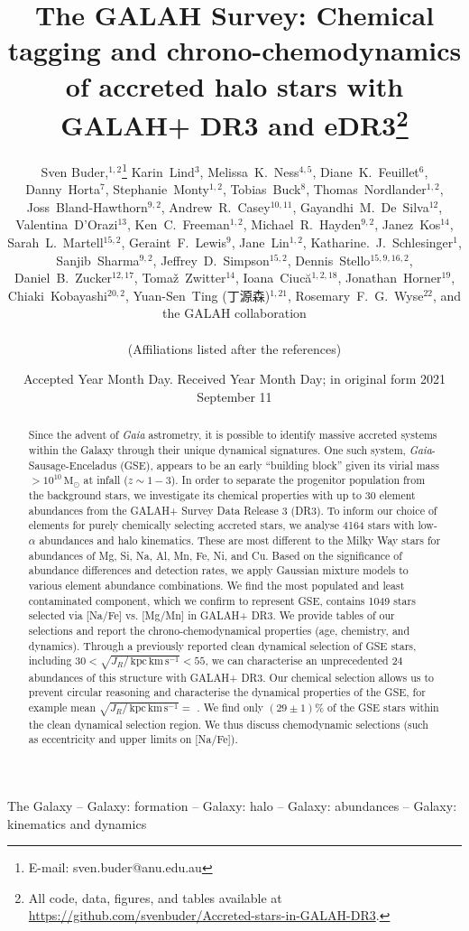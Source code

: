 \documentclass[fleqn,usenatbib]{mnras}
\title[Accreted stars in GALAH+ DR3]{The GALAH Survey: Chemical tagging and chrono-chemodynamics of accreted halo stars with GALAH+ DR3 and \Gaia eDR3\thanks{All code, data, figures, and tables available at \url{https://github.com/svenbuder/Accreted-stars-in-GALAH-DR3}.}}
\author[S. Buder et al.]{Sven Buder,$^{1,2}$\thanks{E-mail: sven.buder@anu.edu.au}
Karin~Lind$^{3}$, 
Melissa~K.~Ness$^{4,5}$, 
Diane~K.~Feuillet$^{6}$,
Danny~Horta$^{7}$,
Stephanie~Monty$^{1,2}$, \newauthor
Tobias~Buck$^{8}$, 
Thomas~Nordlander$^{1,2}$,
Joss~Bland-Hawthorn$^{9,2}$,
Andrew~R.~Casey$^{10,11}$,\newauthor
Gayandhi~M.~De~Silva$^{12}$,
Valentina~{D'Orazi}$^{13}$,
Ken~C.~Freeman$^{1,2}$, 
Michael~R.~Hayden$^{9,2}$,
Janez~Kos$^{14}$, \newauthor
Sarah~L.~Martell$^{15,2}$, 
Geraint~F.~Lewis$^{9}$,
Jane~Lin$^{1,2}$, 
Katharine.~J.~Schlesinger$^{1}$, 
Sanjib~Sharma$^{9,2}$, \newauthor
Jeffrey~D.~Simpson$^{15,2}$, 
Dennis~Stello$^{15,9,16,2}$,
Daniel~B.~Zucker$^{12,17}$, 
Toma\v{z}~Zwitter$^{14}$,
Ioana~Ciuc\u{a}$^{1,2,18}$,\newauthor
Jonathan~Horner$^{19}$,
Chiaki~Kobayashi$^{20,2}$,
Yuan-Sen~Ting (丁源森)$^{1,21}$,
Rosemary~F.~G.~Wyse$^{22}$, \newauthor
and the GALAH collaboration
\\
\\
(Affiliations listed after the references)}
\date{Accepted Year Month Day. Received Year Month Day; in original form 2021 September 11}
\newcommand{\Msol}{\,\mathrm{M_\odot}} %
\newcommand{\kpckms}{\,\mathrm{kpc\,km\,s^{-1}}}	%
\newcommand{\Gaia}{\textit{Gaia}\xspace} %
\begin{document}
\begin{CJK*}{UTF8}{gbsn}
\label{firstpage}
\pagerange{\pageref{firstpage}--\pageref{lastpage}}
\maketitle
\end{CJK*}

\begin{abstract}
Since the advent of \Gaia astrometry, it is possible to identify massive accreted systems within the Galaxy through their unique dynamical signatures. One such system, \Gaia-Sausage-Enceladus (GSE), appears to be an early ``building block'' given its virial mass $> 10^{10}\Msol$ at infall ($z\sim 1-3$). In order to separate the progenitor population from the background stars, we investigate its chemical properties with up to 30 element abundances from the GALAH+ Survey Data Release 3 (DR3). To inform our choice of elements for purely chemically selecting accreted stars, we analyse 4164 stars with low-$\alpha$ abundances and halo kinematics. These are most different to the Milky Way stars for abundances of Mg, Si, Na, Al, Mn, Fe, Ni, and Cu. Based on the significance of abundance differences and detection rates, we apply Gaussian mixture models to various element abundance combinations. We find the most populated and least contaminated component, which we confirm to represent GSE, contains 1049 stars selected via [Na/Fe] vs. [Mg/Mn] in GALAH+ DR3. We provide tables of our selections and report the chrono-chemodynamical properties (age, chemistry, and dynamics). Through a previously reported clean dynamical selection of GSE stars, including $30 < \sqrt{J_R / \kpckms} < 55$, we can characterise an unprecedented 24 abundances of this structure with GALAH+ DR3. Our chemical selection allows us to prevent circular reasoning and characterise the dynamical properties of the GSE, for example mean $\sqrt{J_R / \kpckms} = $ . We find only $(29\pm1)\%$ of the GSE stars within the clean dynamical selection region. We thus discuss chemodynamic selections (such as eccentricity and upper limits on [Na/Fe]).
\href{https://github.com/svenbuder/Accreted-stars-in-GALAH-DR3}{\faGithub}
\end{abstract}

\begin{keywords}
The Galaxy -- Galaxy: formation -- Galaxy: halo -- Galaxy: abundances -- Galaxy: kinematics and dynamics
\end{keywords}
\end{document}
